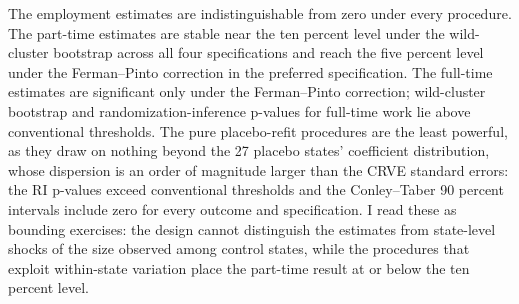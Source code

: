 \documentclass[11pt]{article}
\begin{document}
The employment estimates are indistinguishable from zero under every procedure. The part-time estimates are stable near the ten percent level under the wild-cluster bootstrap across all four specifications and reach the five percent level under the Ferman--Pinto correction in the preferred specification. The full-time estimates are significant only under the Ferman--Pinto correction; wild-cluster bootstrap and randomization-inference p-values for full-time work lie above conventional thresholds. The pure placebo-refit procedures are the least powerful, as they draw on nothing beyond the 27 placebo states' coefficient distribution, whose dispersion is an order of magnitude larger than the CRVE standard errors: the RI p-values exceed conventional thresholds and the Conley--Taber 90 percent intervals include zero for every outcome and specification. I read these as bounding exercises: the design cannot distinguish the estimates from state-level shocks of the size observed among control states, while the procedures that exploit within-state variation place the part-time result at or below the ten percent level.
\end{document}
